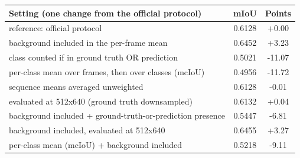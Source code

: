 \begin{tabular}{lcc}
\hline
Setting (one change from the official protocol) & mIoU & Points \\
\hline
reference: official protocol & 0.6128 & +0.00 \\
background included in the per-frame mean & 0.6452 & +3.23 \\
class counted if in ground truth OR prediction & 0.5021 & -11.07 \\
per-class mean over frames, then over classes (mcIoU) & 0.4956 & -11.72 \\
sequence means averaged unweighted & 0.6128 & -0.01 \\
evaluated at 512x640 (ground truth downsampled) & 0.6132 & +0.04 \\
background included + ground-truth-or-prediction presence & 0.5447 & -6.81 \\
background included, evaluated at 512x640 & 0.6455 & +3.27 \\
per-class mean (mcIoU) + background included & 0.5218 & -9.11 \\
\hline
\end{tabular}
